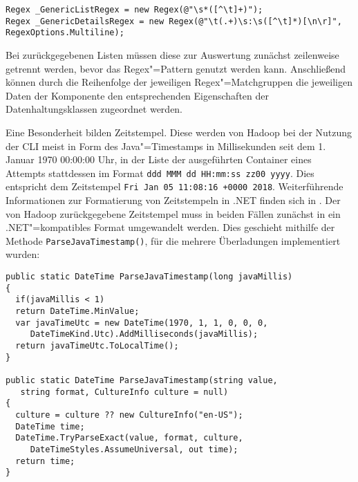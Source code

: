 \begin{lstlisting}[label=lst:cmdRegexPattern,style=cs,
caption={[Implementierte \acs{Regex}"=Pattern im CmdParser]
    Implementierte \acs{Regex}"=Pattern im \texttt{CmdParser}}]
Regex _GenericListRegex = new Regex(@"\s*([^\t]+)");
Regex _GenericDetailsRegex = new Regex(@"\t(.+)\s:\s([^\t]*)[\n\r]", RegexOptions.Multiline);
\end{lstlisting}

Bei zurückgegebenen Listen müssen diese zur Auswertung zunächst zeilenweise getrennt werden, bevor das Regex"=Pattern genutzt werden kann.
Anschließend können durch die Reihenfolge der jeweiligen Regex"=Matchgruppen die jeweiligen Daten der Komponente den entsprechenden Eigenschaften der Datenhaltungsklassen zugeordnet werden.

Eine Besonderheit bilden Zeitstempel.
Diese werden von Hadoop bei der Nutzung der CLI meist in Form des Java"=Timestamps in Millisekunden seit dem 1. Januar 1970 00:00:00 Uhr, in der Liste der ausgeführten Container eines Attempts stattdessen im Format \texttt{ddd MMM dd HH:mm:ss zz00 yyyy}.
Dies entspricht \zB dem Zeitstempel \texttt{Fri Jan 05 11:08:16 +0000 2018}.
Weiterführende Informationen zur Formatierung von Zeitstempeln in .NET finden sich in \cite{CsTimeFormatStrings}.
Der von Hadoop zurückgegebene Zeitstempel muss in beiden Fällen zunächst in ein .NET"=kompatibles Format umgewandelt werden.
Dies geschieht mithilfe der Methode \texttt{ParseJavaTimestamp()}, für die mehrere Überladungen implementiert wurden:

\begin{lstlisting}[label=lst:parseJavaTimestamp,style=cs,
caption={[Überladungen der Methode ParseJavaTimestamp()]
    Überladungen der Methode \texttt{ParseJavaTimestamp()}.
    Es steht zudem eine weitere Überladung zur Verfügung, um den Timestamp in Form der Millisekunden seit 1970 als \texttt{string} zu übergeben.
    Dabei wird der \texttt{string} in einen \texttt{long} konvertiert und anschließend die erste hier gezeigte Überladung aufgerufen.}]
public static DateTime ParseJavaTimestamp(long javaMillis)
{
  if(javaMillis < 1)
  return DateTime.MinValue;
  var javaTimeUtc = new DateTime(1970, 1, 1, 0, 0, 0,
     DateTimeKind.Utc).AddMilliseconds(javaMillis);
  return javaTimeUtc.ToLocalTime();
}

public static DateTime ParseJavaTimestamp(string value,
   string format, CultureInfo culture = null)
{
  culture = culture ?? new CultureInfo("en-US");
  DateTime time;
  DateTime.TryParseExact(value, format, culture,
     DateTimeStyles.AssumeUniversal, out time);
  return time;
}
\end{lstlisting}


